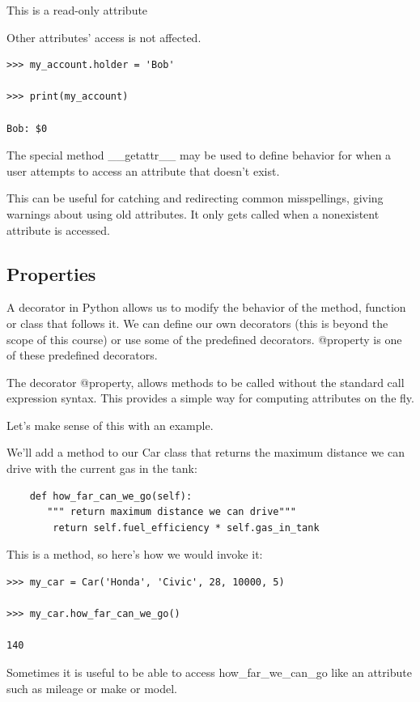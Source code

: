 \documentclass{article}
\begin{document}
This is a read-only attribute

Other attributes' access is not affected.

\begin{lstlisting}
>>> my_account.holder = 'Bob'

>>> print(my_account)

Bob: $0
\end{lstlisting}

The special method {\_}{\_}getattr{\_}{\_} may be used to define behavior for when a user attempts to access an attribute that doesn't exist.

This can be useful for catching and redirecting common misspellings, giving warnings about using old attributes.  It only gets called when a nonexistent attribute is accessed.

\subsection{Properties}

A decorator in Python allows us to modify the behavior of the method, function or class that follows it.  We can define our own decorators (this is beyond the scope of this course) or use some of the predefined decorators.  @property is one of these predefined decorators.

The decorator @property, allows methods to be called without the standard call expression syntax.  This provides a simple way for computing attributes on the fly.

Let's make sense of this with an example.

We'll add a method to our Car class that returns the maximum distance we can drive with the current gas in the tank: 

\begin{lstlisting}
    def how_far_can_we_go(self):
       """ return maximum distance we can drive"""
        return self.fuel_efficiency * self.gas_in_tank
\end{lstlisting}

This is a method, so here’s how we would invoke it:

\begin{lstlisting}
>>> my_car = Car('Honda', 'Civic', 28, 10000, 5)

>>> my_car.how_far_can_we_go()

140
\end{lstlisting}

Sometimes it is useful to be able to access how{\_}far{\_}we{\_}can{\_}go like an attribute such as mileage or make or model.
\end{document}
